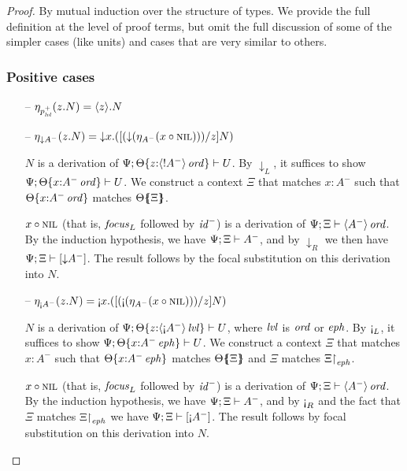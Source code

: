 \begin{proof} By mutual induction over the structure of types. We 
provide the full definition at the level of proof terms, but omit
the full discussion of some of the simpler cases (like units) and
cases that are very similar to others.

\subsubsection{Positive cases}

\begin{itemize}
\item[--] $\etapa{z}{N}{p^+_\mlvl} = \tetap{z}{N}$
\item[--] $\etapa{z}{N}{{\downarrow}A^-} 
           = \tdownl{x}{([(\tdownr{(\etana{\tfocusl{x}{\tnil}}{A^-})})/z]N)}$
  \smallskip

  $N$ is a derivation of 
  $\foc{\Psi}{\tackon{\Theta}{z{:}\istrue{\susp{{!}A^-}}}}{U}$.
  By ${\downarrow_L}$, it suffices to show 
  $\foc{\Psi}{\tackon{\Theta}{x{:}\istrue{A^-}}}{U}$.
  We construct a context $\Xi$ that matches $x{:}A^-$ such that
  $\tackon{\Theta}{x{:}\istrue{A^-}}$ matches $\frameoff{\Theta}{\Xi}$.
  \smallskip

  $\tfocusl{x}{\tnil}$ (that is, ${\it focus}_L$ followed by ${\it id}^-$) 
  is a derivation of 
  $\foc{\Psi}{\Xi}{\istrue{\susp{A^-}}}$.
  By the induction hypothesis, we have 
  $\foc{\Psi}{\Xi}{A^-}$, and by ${\downarrow}_R$
  we then have 
  $\foc{\Psi}{\Xi}{[ {\downarrow}{A^-} ]}$. 
  The result follows by the focal substitution on this derivation into $N$.
  \smallskip

\item[--] $\etapa{z}{N}{{\scriptgnab}A^-}
           = \tgnabl{x}{([(\tgnabr{(\etana{\tfocusl{x}{\tnil}}{A^-})})/z]N)}$ 
  \smallskip

  $N$ is a derivation of 
  $\foc{\Psi}{\tackon{\Theta}{z{:}\islvl{\susp{{\gnab}A^-}}}}{U}$, where
  $\mlvl$ is $\mtrue$ or $\meph$.
  By ${\gnab}_L$, it suffices to show 
  $\foc{\Psi}{\tackon{\Theta}{x{:}\iseph{A^-}}}{U}$.
  We construct a context $\Xi$ that matches $x{:}A^-$ such that
  $\tackon{\Theta}{x{:}\iseph{A^-}}$ matches $\frameoff{\Theta}{\Xi}$
  and $\Xi$ matches $\restrictto{\Xi}{\meph}$.
  \smallskip

  $\tfocusl{x}{\tnil}$ (that is, ${\it focus}_L$ followed by
  ${\it id}^-$) is a derivation of $\foc{\Psi}{\Xi}{\istrue{\susp{A^-}}}$. 
  By the induction hypothesis, we have $\foc{\Psi}{\Xi}{A^-}$, 
  and by ${\gnab}_R$ and the fact that $\Xi$ matches $\restrictto{\Xi}{\meph}$
  we have $\foc{\Psi}{\Xi}{[{\gnab}A^-]}$. The result follows
  by focal substitution on this derivation into $N$.
  \smallskip


\end{itemize}
\end{proof}
